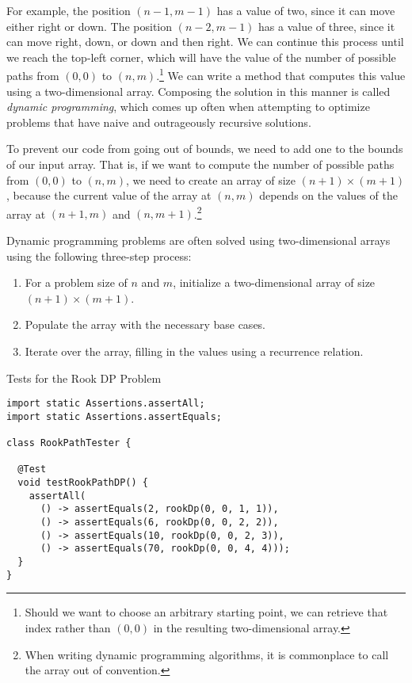 For example, the position $(n - 1, m - 1)$ has a value of two, since it can move either right or down. The position $(n - 2, m - 1)$ has a value of three, since it can move right, down, or down and then right. We can continue this process until we reach the top-left corner, which will have the value of the number of possible paths from $(0, 0)$ to $(n, m)$.\footnote{Should we want to choose an arbitrary starting point, we can retrieve that index rather than $(0, 0)$ in the resulting two-dimensional array.} We can write a method that computes this value using a two-dimensional array. Composing the solution in this manner is called \emph{dynamic programming}, which comes up often when attempting to optimize problems that have naive and outrageously recursive solutions.

To prevent our code from going out of bounds, we need to add one to the bounds of our input array. That is, if we want to compute the number of possible paths from $(0, 0)$ to $(n, m)$, we need to create an array of size $(n + 1) \times (m + 1)$, because the current value of the array at $(n, m)$ depends on the values of the array at $(n + 1, m)$ and $(n, m + 1)$.\footnote{When writing dynamic programming algorithms, it is commonplace to call the array  out of convention.} 

Dynamic programming problems are often solved using two-dimensional arrays using the following three-step process: 

\begin{enumerate}
  \item For a problem size of $n$ and $m$, initialize a two-dimensional array of size $(n + 1) \times (m + 1)$.
  \item Populate the array with the necessary base cases.
  \item Iterate over the array, filling in the values using a recurrence relation.
\end{enumerate}

\begin{cl}[]{Tests for the Rook DP Problem}
\begin{lstlisting}[language=MyJava]
import static Assertions.assertAll;
import static Assertions.assertEquals;

class RookPathTester {

  @Test
  void testRookPathDP() {
    assertAll(
      () -> assertEquals(2, rookDp(0, 0, 1, 1)),
      () -> assertEquals(6, rookDp(0, 0, 2, 2)),
      () -> assertEquals(10, rookDp(0, 0, 2, 3)),
      () -> assertEquals(70, rookDp(0, 0, 4, 4)));
  }
}
\end{lstlisting}
\end{cl}

